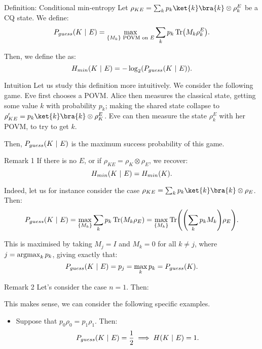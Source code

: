\documentclass[a4paper]{article}
\begin{document}
\begin{parag}{Definition: Conditional min-entropy}
    Let $\rho_{KE} = \sum_{k} p_k \ket{k}\bra{k} \otimes \rho_k^E$ be a CQ state. We define: 
    \[P_{guess}\left(K \suchthat E\right) = \max_{\left\{M_k\right\} \text{ POVM on $E$}} \sum_{k} p_k \Tr\left(M_k \rho_k^E\right).\]

    Then, we define the  as:
    \[H_{min}\left(K \suchthat E\right) = -\log_2\left(P_{guess}\left(K \suchthat E\right)\right).\]

    \begin{subparag}{Intuition}
        Let us study this definition more intuitively. We consider the following game. Eve first chooses a POVM. Alice then measures the classical state, getting some value $k$ with probability $p_k$; making the shared state collapse to $\rho_{KE}' = p_k \ket{k}\bra{k} \otimes \rho_K^E$. Eve can then measure the state $\rho_k^E$ with her POVM, to try to get $k$. 

        Then, $P_{guess}\left(K \suchthat E\right)$ is the maximum success probability of this game.
    \end{subparag}

    \begin{subparag}{Remark 1}
        If there is no $E$, or if $\rho_{KE} = \rho_K \otimes \rho_E$, we recover: 
        \[H_{min}\left(K \suchthat E\right) = H_{min}\left(K\right).\]

        Indeed, let us for instance consider the case $\rho_{KE} = \sum_{k} p_k \ket{k}\bra{k} \otimes \rho_E$. Then: 
        \[P_{guess}\left(K \suchthat E\right) = \max_{\left\{M_k\right\}} \sum_{k} p_k \Tr\left(M_k \rho_E\right) = \max_{\left\{M_k\right\}} \Tr\left(\left(\sum_{k} p_k M_k\right) \rho_E\right).\]

        This is maximised by taking $M_j = I$ and $M_k = 0$ for all $k \neq j$, where $j = \operatorname*{argmax}_k p_k$, giving exactly that: 
        \[P_{guess}\left(K \suchthat E\right) = p_j = \max_k p_k = P_{guess}\left(K\right).\]
    \end{subparag}

    \begin{subparag}{Remark 2}
        Let's consider the case $n = 1$. Then: 

        This makes sense, we can consider the following specific examples.
        \begin{itemize}[left=0pt]
            \item Suppose that $p_0 \rho_0 = p_1 \rho_1$. Then:
            \[P_{guess}\left(K \suchthat E\right) = \frac{1}{2} \implies H\left(K \suchthat E\right) = 1.\]


\end{itemize}
\end{subparag}
\end{parag}
\end{document}
